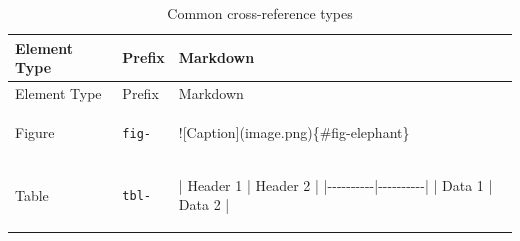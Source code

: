 \documentclass[
  letterpaper,
  DIV=11,
  numbers=noendperiod,
  oneside]{scrreprt}
\newenvironment{Shaded}{\begin{snugshade}}{\end{snugshade}}
\newcommand{\AlertTok}[1]{\textcolor[rgb]{0.68,0.00,0.00}{#1}}
\newcommand{\NormalTok}[1]{\textcolor[rgb]{0.00,0.23,0.31}{#1}}
\newcommand{\PreprocessorTok}[1]{\textcolor[rgb]{0.68,0.00,0.00}{#1}}
\begin{document}
\begin{tcolorbox}
\begin{longtable}[]{@{}
  >{\raggedright\arraybackslash}p{}
  >{\raggedright\arraybackslash}p{}
  >{\raggedright\arraybackslash}p{}@{}}
\caption[]{Common cross-reference
types}\label{tbl-crossref-prefixes}\tabularnewline
\toprule\noalign{}
\begin{minipage}[b]{\linewidth}\raggedright
Element Type
\end{minipage} & \begin{minipage}[b]{\linewidth}\raggedright
Prefix
\end{minipage} & \begin{minipage}[b]{\linewidth}\raggedright
Markdown
\end{minipage} \\
\midrule\noalign{}
\endfirsthead
\toprule\noalign{}
\begin{minipage}[b]{\linewidth}\raggedright
Element Type
\end{minipage} & \begin{minipage}[b]{\linewidth}\raggedright
Prefix
\end{minipage} & \begin{minipage}[b]{\linewidth}\raggedright
Markdown
\end{minipage} \\
\midrule\noalign{}
\endhead
\bottomrule\noalign{}
\endlastfoot
Figure & \texttt{fig-} & \begin{minipage}[t]{\linewidth}\raggedright
\begin{Shaded}
\begin{Highlighting}[]
\AlertTok{![Caption](image.png)}\NormalTok{\{\#fig{-}elephant\}}
\end{Highlighting}
\end{Shaded}
\end{minipage} \\
Table & \texttt{tbl-} & \begin{minipage}[t]{\linewidth}\raggedright
\begin{Shaded}
\begin{Highlighting}[]
\PreprocessorTok{|}\NormalTok{ Header 1 }\PreprocessorTok{|}\NormalTok{ Header 2 }\PreprocessorTok{|}
\PreprocessorTok{|{-}{-}{-}{-}{-}{-}{-}{-}{-}{-}|{-}{-}{-}{-}{-}{-}{-}{-}{-}{-}|}
\PreprocessorTok{|}\NormalTok{ Data 1   }\PreprocessorTok{|}\NormalTok{ Data 2   }\PreprocessorTok{|}


\end{Highlighting}
\end{Shaded}
\end{minipage}
\end{longtable}
\end{tcolorbox}
\end{document}
